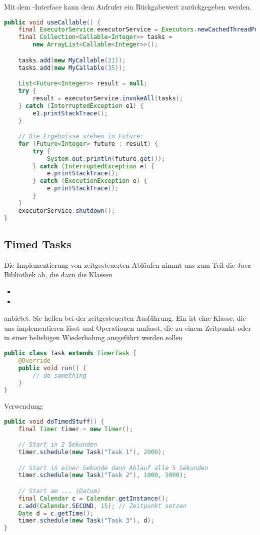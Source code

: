Mit dem -Interface kann dem Aufrufer ein Rückgabewert zurückgegeben werden.

\begin{lstlisting}[language=Java]
public void useCallable() {
	final ExecutorService executorService = Executors.newCachedThreadPool();
	final Collection<Callable<Integer>> tasks =
		new ArrayList<Callable<Integer>>();

	tasks.add(new MyCallable(21));
	tasks.add(new MyCallable(35));

	List<Future<Integer>> result = null;
	try {
		result = executorService.invokeAll(tasks);
	} catch (InterruptedException e1) {
		e1.printStackTrace();
	}

	// Die Ergebnisse stehen in Future:
	for (Future<Integer> future : result) {
		try {
			System.out.println(future.get());
		} catch (InterruptedException e) {
			e.printStackTrace();
		} catch (ExecutionException e) {
			e.printStackTrace();
		}
	}
	executorService.shutdown();
}
\end{lstlisting}

\subsection{Timed Tasks}
Die Implementierung von zeitgesteuerten Abläufen nimmt uns zum Teil die Java-Bibliothek ab, die dazu die Klassen
\begin{itemize}
	\item {}
	\item {}
\end{itemize}
anbietet. Sie helfen bei der zeitgesteuerten Ausführung. Ein  ist eine Klasse, die uns  implementieren lässt und Operationen umfasst, die zu einem Zeitpunkt oder in einer beliebigen Wiederholung ausgeführt werden sollen

\begin{lstlisting}[language=Java]
public class Task extends TimerTask {
	@Override
	public void run() {
		// do something
	}
}	
\end{lstlisting}

Verwendung:
\begin{lstlisting}[language=Java]
public void doTimedStuff() {
	final Timer timer = new Timer();

	// Start in 2 Sekunden
	timer.schedule(new Task("Task 1"), 2000);

	// Start in einer Sekunde dann Ablauf alle 5 Sekunden
	timer.schedule(new Task("Task 2"), 1000, 5000);

	// Start am ... (Datum)
	final Calendar c = Calendar.getInstance();
	c.add(Calendar.SECOND, 15); // Zeitpunkt setzen
	Date d = c.getTime();
	timer.schedule(new Task("Task 3"), d);
}	
\end{lstlisting}
